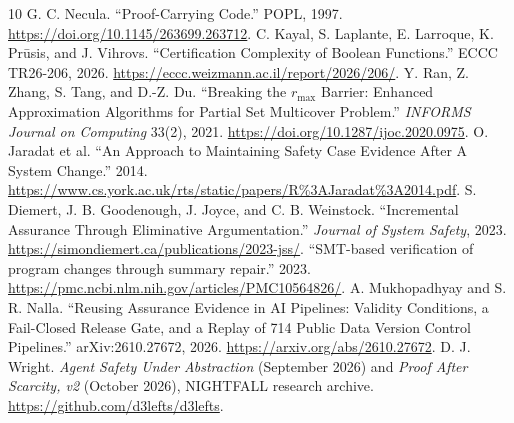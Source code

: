 \documentclass[11pt]{article}
\begin{document}
\begin{thebibliography}{10}\small
{} G. C. Necula. ``Proof-Carrying Code.'' POPL, 1997. \url{https://doi.org/10.1145/263699.263712}.
 C. Kayal, S. Laplante, E. Larroque, K. Pr\=usis, and J. Vihrovs. ``Certification Complexity of Boolean Functions.'' ECCC TR26-206, 2026. \url{https://eccc.weizmann.ac.il/report/2026/206/}.
 Y. Ran, Z. Zhang, S. Tang, and D.-Z. Du. ``Breaking the $r_{\max}$ Barrier: Enhanced Approximation Algorithms for Partial Set Multicover Problem.'' \emph{INFORMS Journal on Computing} 33(2), 2021. \url{https://doi.org/10.1287/ijoc.2020.0975}.
 O. Jaradat et al. ``An Approach to Maintaining Safety Case Evidence After A System Change.'' 2014. \url{https://www.cs.york.ac.uk/rts/static/papers/R%3AJaradat%3A2014.pdf}.
 S. Diemert, J. B. Goodenough, J. Joyce, and C. B. Weinstock. ``Incremental Assurance Through Eliminative Argumentation.'' \emph{Journal of System Safety}, 2023. \url{https://simondiemert.ca/publications/2023-jss/}.
 ``SMT-based verification of program changes through summary repair.'' 2023. \url{https://pmc.ncbi.nlm.nih.gov/articles/PMC10564826/}.
 A. Mukhopadhyay and S. R. Nalla. ``Reusing Assurance Evidence in AI Pipelines: Validity Conditions, a Fail-Closed Release Gate, and a Replay of 714 Public Data Version Control Pipelines.'' arXiv:2610.27672, 2026. \url{https://arxiv.org/abs/2610.27672}.
 D. J. Wright. \emph{Agent Safety Under Abstraction} (September 2026) and \emph{Proof After Scarcity, v2} (October 2026), NIGHTFALL research archive. \url{https://github.com/d3lefts/d3lefts}.
\end{thebibliography}
\end{document}
